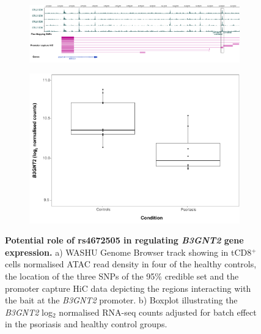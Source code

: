 \begin{figure}[htbp]
\centering
\begin{subfigure}{0.5\textwidth}
\centering
\includegraphics[width=\textwidth]{./Results2/pdfs/B3GNT2_HiCi_WASHU_track}
\caption{\textbf{}}
\end{subfigure}
\begin{subfigure}{0.5\textwidth}
\centering
\includegraphics[width=\textwidth]{./Results2/pdfs/RNA_PS_CTL_B3GNT2_expression_CD8}
\caption{\textbf{}}
\end{subfigure}
\caption[Potential role of rs4672505 in regulating \textit{B3GNT2} gene expression.]{\textbf{Potential role of rs4672505 in regulating \textit{B3GNT2} gene expression.} a) WASHU Genome Browser track showing in tCD8$^+$ cells normalised ATAC read density in four of the healthy controls, the location of the three SNPs of the 95\% credible set and the promoter capture HiC data depicting the regions interacting with the bait at the \textit{B3GNT2} promoter. b) Boxplot illustrating the \textit{B3GNT2} log$_2$ normalised RNA-seq counts adjusted for batch effect in the psoriasis and healthy control groups.}
\label{figure:RNA_chromatin_interaction_B3GNT2}
\end{figure} 



